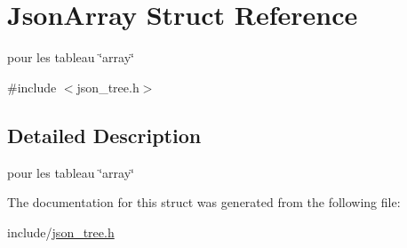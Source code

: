 \hypertarget{structJsonArray}{}\section{Json\+Array Struct Reference}
\label{structJsonArray}


pour les tableau \char`\"{}array\char`\"{}  




{\ttfamily \#include $<$json\+\_\+tree.\+h$>$}



\subsection{Detailed Description}
pour les tableau \char`\"{}array\char`\"{} 

The documentation for this struct was generated from the following file\+:\begin{DoxyCompactItemize}
\item 
include/\hyperlink{json__tree_8h}{json\+\_\+tree.\+h}\end{DoxyCompactItemize}
